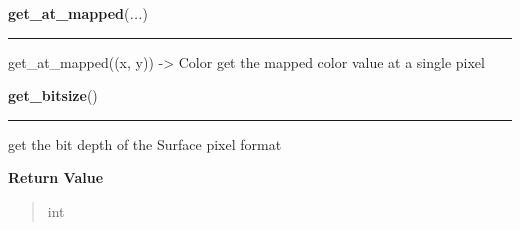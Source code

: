     \label{pygame:Surface:get_at_mapped}

    \vspace{0.5ex}

\hspace{.8\funcindent}\begin{boxedminipage}{\funcwidth}

    \raggedright \textbf{get\_at\_mapped}(\textit{...})

    \vspace{-1.5ex}

    \rule{\textwidth}{0.5\fboxrule}
\setlength{\parskip}{2ex}
    get\_at\_mapped((x, y)) -{\textgreater} Color get the mapped color 
    value at a single pixel

\setlength{\parskip}{1ex}
    \end{boxedminipage}

    \label{pygame:Surface:get_bitsize}

    \vspace{0.5ex}

\hspace{.8\funcindent}\begin{boxedminipage}{\funcwidth}

    \raggedright \textbf{get\_bitsize}()

    \vspace{-1.5ex}

    \rule{\textwidth}{0.5\fboxrule}
\setlength{\parskip}{2ex}
    get the bit depth of the Surface pixel format

\setlength{\parskip}{1ex}
      \textbf{Return Value}
    \vspace{-1ex}

      \begin{quote}
      int

      \end{quote}

    \end{boxedminipage}

    \label{pygame:Surface:get_bounding_rect}

    \vspace{0.5ex}

